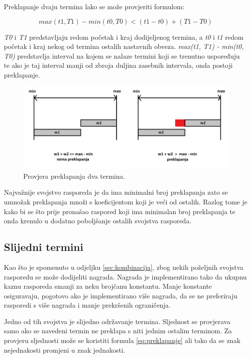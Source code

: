 \documentclass[times, utf8, zavrsni]{fer}
\begin{document}
Preklapanje dvaju termina lako se može provjeriti formulom:

\begin{equation}
max(t1, T1) - min(t0, T0) < (t1 - t0) + (T1  - T0)
\label{eq:preklapanje}
\end{equation}

\emph{T0} i \emph{T1} predstavljaju redom početak i kraj dodijeljenog termina, a \emph{t0} i \emph{t1} redom početak i kraj nekog od termina ostalih nastavnih obveza. \emph{max(t1, T1) - min(t0, T0)} predstavlja interval na kojem se nalaze termini koji se trenutno uspoređuju te ako je taj interval manji od zbroja duljina zasebnih intervala, onda postoji preklapanje.

\begin{figure}[htb]
\centering
\includegraphics[width=15cm]{images/preklapanja.png}
\caption{Provjera preklapanja dva termina.}
\label{fig:preklapanja}
\end{figure}

Najvažnije svojstvo rasporeda je da ima minimalni broj preklapanja zato se umnožak preklapanja množi s koeficijentom koji je veći od ostalih. Razlog tome je kako bi se što prije pronašao raspored koji ima minimalan broj preklapanja te onda krenulo u dodatno poboljšanje ostalih svojstva rasporeda.

\subsection{Slijedni termini}

Kao što je spomenuto u odjeljku \ref{sec:kombinacija}, zbog nekih poželjnih svojstva rasporedu se može dodijeliti nagrada. Nagrada je implementirano tako da ukupnu kaznu rasporeda smanji za neku brojčanu konstantu. Manje konstante osiguravaju, pogotovo ako je implementirano više nagrada, da se ne preferiraju rasporedi s više nagrada i manje prekršenih ograničenja. 

Jedno od tih svojstva je slijedno održavanje termina. Sljednost se provjerava samo ako se navedeni termin ne preklapa s niti jednim ostalim terminom. Za provjeru sljednosti može se koristiti formula \ref{eq:preklapanje} ali tako da se znak nejednakosti promjeni u znak jednakosti.
\end{document}
